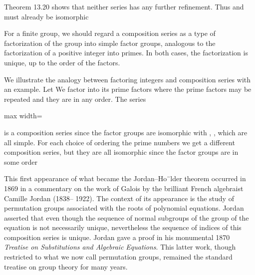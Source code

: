 \documentclass[11pt,oneside]{article}
\begin{document}
\BookNarrativetrue

\begin{BookBody}

\noindent Theorem 13.20 shows that neither series has any further refinement. Thus  and  must already be isomorphic\BookEnd{\blacklozenge}

For a finite group, we should regard a composition series as a type of factorization of the group into simple factor groups, analogous to the factorization of a positive integer into primes. In both cases, the factorization is unique, up to the order of the factors.

 We illustrate the analogy between factoring integers and composition series with an example. Let  We factor  into its prime factors  where the prime factors may be repeated and they are in any order. The series

\begin{center}\begin{adjustbox}{max width=\linewidth}\end{adjustbox}\end{center}

\noindent is a composition series since the factor groups are isomorphic with , , which are all simple. For each choice of ordering the prime numbers  we get a different composition series, but they are all isomorphic since the factor groups are  in some order\BookEnd{\blacktriangle}


\noindent This first appearance of what became the Jordan–Ho¨lder theorem occurred in 1869 in a commentary on the work of Galois by the brilliant French algebraist Camille Jordan (1838– 1922). The context of its appearance is the study of permutation groups associated with the roots of polynomial equations. Jordan asserted that even though the sequence of normal subgroups  of the group of the equation is not necessarily unique, nevertheless the sequence of indices of this composition series is unique. Jordan gave a proof in his monumental 1870\textit{ Treatise on Substitutions and Algebraic} \textit{Equations}. This latter work, though restricted to what we now call permutation groups, remained the standard treatise on group theory for many years.


\end{BookBody}
\end{document}
